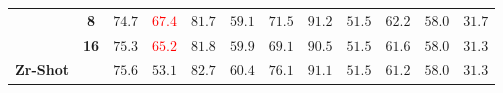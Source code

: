 \begin{table}
\begin{center}
\begin{tabular}{l c c c c c c c c c c c}
 & \textbf{8} & $74.7$ &  \textcolor{red}{$67.4$} & $81.7$ & $59.1$ & $71.5$ & $91.2$ & $51.5$ & $62.2$ & $58.0$ & $31.7$ \\
 & \textbf{16} & $75.3$ &  \textcolor{red}{$65.2$} & $81.8$ & $59.9$ & $69.1$ & $90.5$ & $51.5$ & $61.6$ & $58.0$ & $31.3$ \\
\midrule
\midrule
\textbf{Zr-Shot} & & $75.6$ & $53.1$ & $82.7$ & $60.4$ & $76.1$ & $91.1$ & $51.5$ & $61.2$ & $58.0$ & $31.3$ \\
\bottomrule
\end{tabular}
\endgroup
\end{center}
\vskip -0.1in
\end{table}